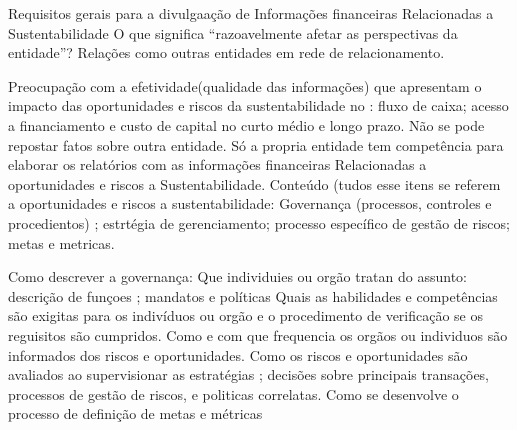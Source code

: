 Requisitos gerais para a divulgaação de Informações financeiras Relacionadas a Sustentabilidade
O que significa ``razoavelmente afetar as perspectivas da entidade''?
Relações como outras entidades em rede de relacionamento.

Preocupação com a efetividade(qualidade das informações) que apresentam o impacto das oportunidades e riscos da sustentabilidade no : fluxo de caixa; acesso a financiamento e custo de capital no curto médio e longo prazo.
Não se pode repostar fatos sobre outra entidade. Só a propria entidade tem competência para elaborar os relatórios com as informações financeiras Relacionadas a oportunidades e riscos a Sustentabilidade.
Conteúdo (tudos esse itens se referem a oportunidades e riscos a sustentabilidade: Governança (processos, controles e procedientos) ; estrtégia de gerenciamento; processo específico de gestão de riscos; metas e metricas.

Como descrever a governança:
     Que individuies ou orgão tratan do assunto: descrição de funçoes ; mandatos e políticas
     Quais as habilidades e competências são exigitas para os indivíduos ou orgão e o procedimento de verificação se os reguisitos são cumpridos.
     Como e com que frequencia os orgãos ou individuos são informados dos riscos e oportunidades.
     Como os riscos e oportunidades são avaliados ao supervisionar as estratégias ; decisões sobre principais transações, processos de gestão de riscos, e politicas correlatas.
     Como se desenvolve o processo de definição de metas e métricas
     


